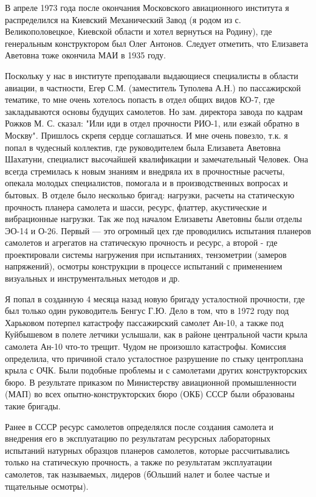 В апреле 1973 года после окончания Московского авиационного института я
распределился на Киевский Механический Завод (я родом из с. Великополовецкое,
Киевской области и хотел вернуться на Родину), где генеральным конструктором
был Олег Антонов. Следует отметить, что Елизавета Аветовна тоже окончила МАИ в
1935 году.

Поскольку у нас в институте преподавали выдающиеся специалисты в области
авиации, в частности, Егер С.М. (заместитель Туполева А.Н.) по пассажирской
тематике, то мне очень хотелось попасть в отдел общих видов КО-7, где
закладываются основы будущих самолетов. Но зам. директора завода по кадрам
Рожков М. С. сказал: "Или иди в отдел прочности РИО-1, или езжай обратно в
Москву". Пришлось скрепя сердце соглашаться. И мне очень повезло, т.к. я попал
в чудесный коллектив, где руководителем была Елизавета Аветовна Шахатуни,
специалист высочайшей квалификации и замечательный Человек. Она всегда
стремилась к новым знаниям и внедряла их в прочностные расчеты, опекала молодых
специалистов, помогала и в производственных вопросах и бытовых. В отделе было
несколько бригад: нагрузки, расчеты на статическую прочность планера самолета и
шасси, ресурс, флаттер, акустические и вибрационные нагрузки. Так же под
началом Елизаветы Аветовны были отделы ЭО-14 и О-26. Первый — это огромный цех
где проводились испытания планеров самолетов и агрегатов на статическую
прочность и ресурс, а второй - где проектировали системы нагружения при
испытаниях, тензометрии (замеров напряжений), осмотры конструкции в процессе
испытаний с применением визуальных и инструментальных методов и др.

Я попал в созданную 4 месяца назад новую бригаду усталостной прочности, где был
только один руководитель Бенгус Г.Ю. Дело в том, что в 1972 году под Харьковом
потерпел катастрофу пассажирский самолет Ан-10, а также под Куйбышевом в полете
летчики услышали, как в районе центральной части крыла самолета Ан-10 что-то
трещит. Чудом не произошло катастрофы. Комиссия определила, что причиной стало
усталостное разрушение по стыку центроплана крыла с ОЧК. Были подобные проблемы
и с самолетами других конструкторских бюро. В результате приказом по
Министерству авиационной промышленности (МАП) во всех опытно-конструкторских
бюро (ОКБ) СССР были образованы такие бригады.

Ранее в СССР ресурс самолетов определялся после создания самолета и внедрения
его в эксплуатацию по результатам ресурсных лабораторных испытаний натурных
образцов планеров самолетов, которые рассчитывались только на статическую
прочность, а также по результатам эксплуатации самолетов, так называемых,
лидеров (бОльший налет и более частые и тщательные осмотры).

